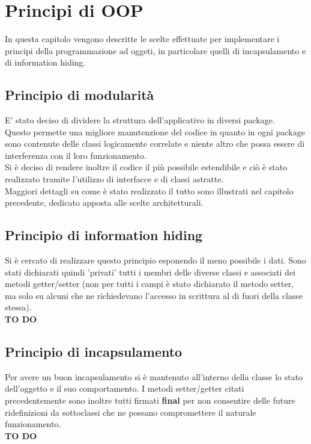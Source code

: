 % 
%
%

\section{Principi di OOP}
In questa capitolo vengono descritte le scelte effettuate per implementare i principi della programmazione ad oggeti, in particolare quelli di incapsulamento e di information hiding. \\

	\subsection{Principio di modularità}
E' stato deciso di dividere la struttura dell'applicativo in diversi package. \\
Questo permette una migliore manutenzione del codice in quanto in ogni package sono contenute delle classi logicamente correlate e niente altro che possa essere di interferenza con il loro funzionamento. \\
Si è deciso di rendere inoltre il codice il più possibile estendibile e ciò è stato realizzato tramite l'utilizzo di interfacce e di classi astratte. \\
Maggiori dettagli su come è stato realizzato il tutto sono illustrati nel capitolo precedente, dedicato apposta alle scelte architetturali.

	\subsection{Principio di information hiding}
Si è cercato di realizzare questo principio esponendo il meno possibile i dati. Sono stati dichiarati quindi 'privati' tutti i membri delle diverse classi e associati dei metodi getter/setter (non per tutti i campi è stato dichiarato il metodo setter, ma solo su alcuni che ne richiedevano l'accesso in scrittura al di fuori della classe stessa).  \\
\textbf{TO DO}
	\subsection{Principio di incapsulamento}
Per avere un buon incapsulamento si è mantenuto all'interno della classe lo stato dell'oggetto e il suo comportamento.
I metodi setter/getter citati precedentemente sono inoltre tutti firmati \textbf{final} per non consentire delle future ridefinizioni da sottoclassi che ne possano compromettere il naturale funzionamento. \\
\textbf{TO DO}

